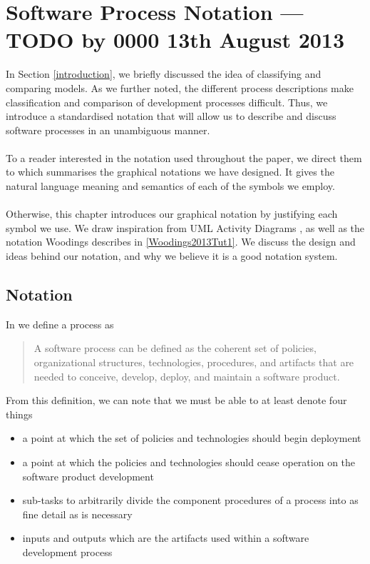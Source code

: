 \section{Software Process Notation --- TODO by 0000 13th August 2013} \label{notation}

In Section \ref{introduction}, we briefly discussed the idea of classifying and comparing models.
As we further noted, the different process descriptions make classification and comparison of
development processes difficult.
Thus, we introduce a standardised notation that will allow us to describe and discuss software
processes in an unambiguous manner.\\
\\
To a reader interested in the notation used throughout the paper, we direct them
to \FIXME which summarises the graphical notations we have
designed.
It gives the natural language meaning and semantics of each of the symbols we employ.\\
\\
Otherwise, this chapter introduces our graphical notation by justifying each symbol we
use.
We draw inspiration from UML Activity Diagrams \cite{Dumas01umlactivity,BellUMLBasics}, as well as
the notation Woodings describes in \ref{Woodings2013Tut1}.
We discuss the design and ideas behind our notation, and why we believe it is a
good notation system.
\subsection{Notation}

In \cite{fuggetta2000software} we define a process as
\begin{quote}
A software process can be defined as the coherent set of policies, organizational structures,
	technologies, procedures, and artifacts that are needed to conceive, develop, deploy, and maintain
	a software product.
\end{quote}

From this definition, we can note that we must be able to at least denote four things
\begin{itemize}
	\item a point at which the set of policies and technologies should begin deployment
	\item a point at which the policies and technologies should cease operation on the software
	product development
	\item sub-tasks to arbitrarily divide the component procedures of a process into as fine detail as
	is necessary
	\item inputs and outputs which are the artifacts used within a software development process
\end{itemize}

